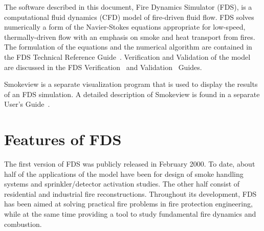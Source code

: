 \documentclass[11pt]{book}
\begin{document}
The software described in this document, Fire Dynamics Simulator (FDS), is a computational
fluid dynamics (CFD) model of fire-driven fluid flow. FDS solves numerically a form of the
Navier-Stokes equations appropriate for low-speed, thermally-driven flow
with an emphasis on smoke and heat transport from fires.
The formulation of the equations and the numerical algorithm are contained in the FDS Technical Reference Guide~\cite{FDS_Math_Guide}.
Verification and Validation of the model are discussed in the FDS Verification~\cite{FDS_Verification_Guide} and Validation~\cite{FDS_Validation_Guide} Guides.

Smokeview is a separate visualization program that is used to display the
results of an FDS simulation.
A detailed description of Smokeview is found in
a separate User's Guide~\cite{Smokeview_Users_Guide}.


\section{Features of FDS}

The first version of FDS was publicly released in February 2000.
To date, about half of the applications of the model have been for design of smoke
handling systems and sprinkler/detector activation studies. The other half consist of
residential and industrial fire reconstructions. Throughout its development, FDS has
been aimed at solving practical fire problems in fire protection engineering, while
at the same time providing a tool to study fundamental fire dynamics and combustion.
\end{document}
